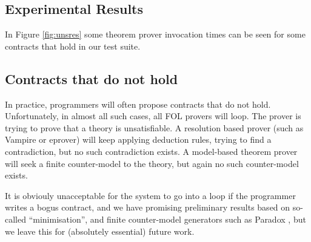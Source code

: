 \subsection{Experimental Results}



In Figure \ref{fig:unsres} some theorem prover invocation times can be
seen for some contracts that hold in our test suite.

\subsection{Contracts that do not hold}

In practice, programmers will often propose contracts that do not hold.
Unfortunately, in almost all such cases, all FOL provers will loop.
The prover is trying to prove that a theory is unsatisfiable.  A resolution
based prover (such as Vampire or eprover) will keep applying deduction rules,
trying to find a contradiction, but no such contradiction exists.  A
model-based theorem prover will seek a finite counter-model to the theory, but
again no such counter-model exists. 

It is obviouly unacceptable for the system to go into a loop if
the programmer writes a bogus contract, and we have promising
preliminary results based on so-called ``minimisation'', and
finite counter-model generators such as Paradox \cite{koen}, but we
leave this for (absolutely essential) future work.

